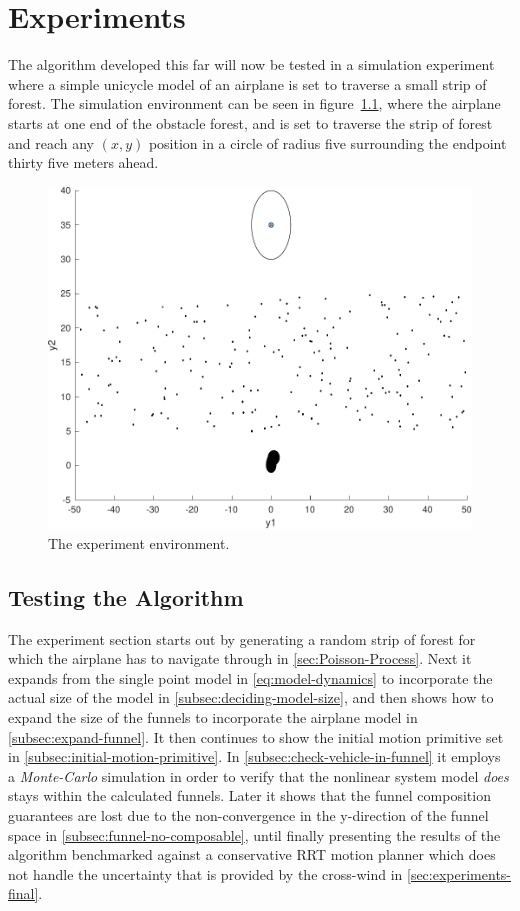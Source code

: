 \chapter{Experiments}
\label{chp:experiments}

The \rrtfunnel{} algorithm developed this far will now be tested in a simulation
experiment where a simple unicycle model of an airplane is set to traverse a
small strip of forest. The simulation environment can be seen in
figure~\cref{fig:simulated-forest}, where the airplane starts at one end of the
obstacle forest, and is set to traverse the strip of forest and reach any
\((x,y)\) position in a circle of radius five surrounding the endpoint thirty
five meters ahead.

\begin{figure}
  \centering
  \includegraphics[width=.8\textwidth]{figures/experiments/simulated-forest} \caption{The
    experiment environment.}
  \label{fig:simulated-forest}
\end{figure}

\section{Testing the \rrtfunnel{} Algorithm}

The experiment section starts out by generating a random strip of forest for
which the airplane has to navigate through in \cref{sec:Poisson-Process}. Next
it expands from the single point model in \cref{eq:model-dynamics} to
incorporate the actual size of the model in \cref{subsec:deciding-model-size},
and then shows how to expand the size of the funnels to incorporate the airplane
model in \cref{subsec:expand-funnel}. It then continues to show the initial
motion primitive set in \cref{subsec:initial-motion-primitive}. In
\cref{subsec:check-vehicle-in-funnel} it employs a \textit{Monte-Carlo}
simulation in order to verify that the nonlinear system model \textit{does}
stays within the calculated funnels. Later it shows that the funnel composition
guarantees are lost due to the non-convergence in the y-direction of the funnel
space in \cref{subsec:funnel-no-composable}, until finally presenting the
results of the \rrtfunnel{} algorithm benchmarked against a conservative
\ac{RRT} motion planner which does not handle the uncertainty that is provided
by the cross-wind in \cref{sec:experiments-final}.

